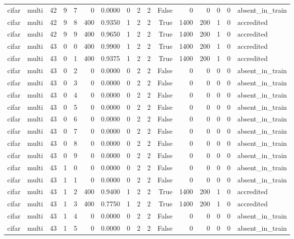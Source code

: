 \begin{tabular}{llrrrrrrrrrrrrrl}
cifar & multi & 42 & 9 & 7 & 0 & 0.0000 & 0 & 2 & 2 & False & 0 & 0 & 0 & 0 & absent\_in\_train \\
cifar & multi & 42 & 9 & 8 & 400 & 0.9350 & 1 & 2 & 2 & True & 1400 & 200 & 1 & 0 & accredited \\
cifar & multi & 42 & 9 & 9 & 400 & 0.9650 & 1 & 2 & 2 & True & 1400 & 200 & 1 & 0 & accredited \\
cifar & multi & 43 & 0 & 0 & 400 & 0.9900 & 1 & 2 & 2 & True & 1400 & 200 & 1 & 0 & accredited \\
cifar & multi & 43 & 0 & 1 & 400 & 0.9375 & 1 & 2 & 2 & True & 1400 & 200 & 1 & 0 & accredited \\
cifar & multi & 43 & 0 & 2 & 0 & 0.0000 & 0 & 2 & 2 & False & 0 & 0 & 0 & 0 & absent\_in\_train \\
cifar & multi & 43 & 0 & 3 & 0 & 0.0000 & 0 & 2 & 2 & False & 0 & 0 & 0 & 0 & absent\_in\_train \\
cifar & multi & 43 & 0 & 4 & 0 & 0.0000 & 0 & 2 & 2 & False & 0 & 0 & 0 & 0 & absent\_in\_train \\
cifar & multi & 43 & 0 & 5 & 0 & 0.0000 & 0 & 2 & 2 & False & 0 & 0 & 0 & 0 & absent\_in\_train \\
cifar & multi & 43 & 0 & 6 & 0 & 0.0000 & 0 & 2 & 2 & False & 0 & 0 & 0 & 0 & absent\_in\_train \\
cifar & multi & 43 & 0 & 7 & 0 & 0.0000 & 0 & 2 & 2 & False & 0 & 0 & 0 & 0 & absent\_in\_train \\
cifar & multi & 43 & 0 & 8 & 0 & 0.0000 & 0 & 2 & 2 & False & 0 & 0 & 0 & 0 & absent\_in\_train \\
cifar & multi & 43 & 0 & 9 & 0 & 0.0000 & 0 & 2 & 2 & False & 0 & 0 & 0 & 0 & absent\_in\_train \\
cifar & multi & 43 & 1 & 0 & 0 & 0.0000 & 0 & 2 & 2 & False & 0 & 0 & 0 & 0 & absent\_in\_train \\
cifar & multi & 43 & 1 & 1 & 0 & 0.0000 & 0 & 2 & 2 & False & 0 & 0 & 0 & 0 & absent\_in\_train \\
cifar & multi & 43 & 1 & 2 & 400 & 0.9400 & 1 & 2 & 2 & True & 1400 & 200 & 1 & 0 & accredited \\
cifar & multi & 43 & 1 & 3 & 400 & 0.7750 & 1 & 2 & 2 & True & 1400 & 200 & 1 & 0 & accredited \\
cifar & multi & 43 & 1 & 4 & 0 & 0.0000 & 0 & 2 & 2 & False & 0 & 0 & 0 & 0 & absent\_in\_train \\
cifar & multi & 43 & 1 & 5 & 0 & 0.0000 & 0 & 2 & 2 & False & 0 & 0 & 0 & 0 & absent\_in\_train \\

\end{tabular}
